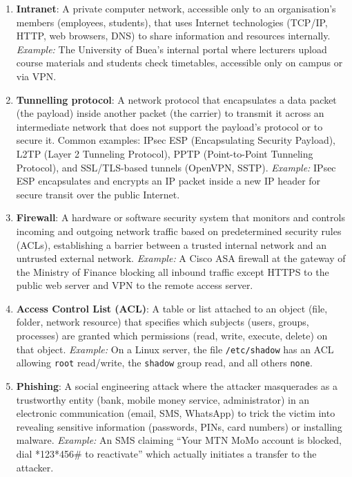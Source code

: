 \documentclass[11pt]{article}
\newcommand{\cle}[1]{{\popxbold\color{popdark}#1}}
\begin{document}
\begin{corrige}
\begin{enumerate}
\item \textbf{\cle{Intranet}}: A private computer network, accessible only to an organisation's members (employees, students), that uses Internet technologies (TCP/IP, HTTP, web browsers, DNS) to share information and resources internally. \emph{Example:} The University of Buea's internal portal where lecturers upload course materials and students check timetables, accessible only on campus or via VPN.
\item \textbf{\cle{Tunnelling protocol}}: A network protocol that encapsulates a data packet (the payload) inside another packet (the carrier) to transmit it across an intermediate network that does not support the payload's protocol or to secure it. Common examples: \cle{IPsec} ESP (Encapsulating Security Payload), \cle{L2TP} (Layer 2 Tunneling Protocol), \cle{PPTP} (Point-to-Point Tunneling Protocol), and SSL/TLS-based tunnels (OpenVPN, SSTP). \emph{Example:} IPsec ESP encapsulates and encrypts an IP packet inside a new IP header for secure transit over the public Internet.
\item \textbf{\cle{Firewall}}: A hardware or software security system that monitors and controls incoming and outgoing network traffic based on predetermined security rules (ACLs), establishing a barrier between a trusted internal network and an untrusted external network. \emph{Example:} A Cisco ASA firewall at the gateway of the Ministry of Finance blocking all inbound traffic except HTTPS to the public web server and VPN to the remote access server.
\item \textbf{\cle{Access Control List (ACL)}}: A table or list attached to an object (file, folder, network resource) that specifies which subjects (users, groups, processes) are granted which permissions (read, write, execute, delete) on that object. \emph{Example:} On a Linux server, the file \texttt{/etc/shadow} has an ACL allowing \texttt{root} read/write, the \texttt{shadow} group read, and all others \texttt{none}.
\item \textbf{\cle{Phishing}}: A social engineering attack where the attacker masquerades as a trustworthy entity (bank, mobile money service, administrator) in an electronic communication (email, SMS, WhatsApp) to trick the victim into revealing sensitive information (passwords, PINs, card numbers) or installing malware. \emph{Example:} An SMS claiming ``Your MTN MoMo account is blocked, dial *123*456\# to reactivate'' which actually initiates a transfer to the attacker.
\end{enumerate}
\end{corrige}
\end{document}
